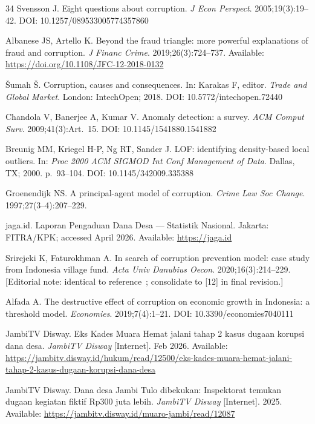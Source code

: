 \documentclass[3p,times,procedia]{elsarticle}
\begin{document}
\begin{thebibliography}{34}
Svensson J. Eight questions about corruption. \textit{J Econ Perspect}. 2005;19(3):19--42. DOI: 10.1257/089533005774357860

Albanese JS, Artello K. Beyond the fraud triangle: more powerful explanations of fraud and corruption. \textit{J Financ Crime}. 2019;26(3):724--737. Available: \url{https://doi.org/10.1108/JFC-12-2018-0132}

\v{S}umah \v{S}. Corruption, causes and consequences. In: Karakas F, editor. \textit{Trade and Global Market}. London: IntechOpen; 2018. DOI: 10.5772/intechopen.72440

Chandola V, Banerjee A, Kumar V. Anomaly detection: a survey. \textit{ACM Comput Surv}. 2009;41(3):Art.~15. DOI: 10.1145/1541880.1541882

Breunig MM, Kriegel H-P, Ng RT, Sander J. LOF: identifying density-based local outliers. In: \textit{Proc 2000 ACM SIGMOD Int Conf Management of Data}. Dallas, TX; 2000. p.\ 93--104. DOI: 10.1145/342009.335388

Groenendijk NS. A principal-agent model of corruption. \textit{Crime Law Soc Change}. 1997;27(3--4):207--229.

jaga.id. Laporan Pengaduan Dana Desa --- Statistik Nasional. Jakarta: FITRA/KPK; accessed April 2026. Available: \url{https://jaga.id}

Srirejeki K, Faturokhman A. In search of corruption prevention model: case study from Indonesia village fund. \textit{Acta Univ Danubius Oecon}. 2020;16(3):214--229. [Editorial note: identical to reference~\cite{ref12}; consolidate to [12] in final revision.]

Alfada A. The destructive effect of corruption on economic growth in Indonesia: a threshold model. \textit{Economies}. 2019;7(4):1--21. DOI: 10.3390/economies7040111

JambiTV Disway. Eks Kades Muara Hemat jalani tahap 2 kasus dugaan korupsi dana desa. \textit{JambiTV Disway} [Internet]. Feb 2026. Available: \url{https://jambitv.disway.id/hukum/read/12500/eks-kades-muara-hemat-jalani-tahap-2-kasus-dugaan-korupsi-dana-desa}

JambiTV Disway. Dana desa Jambi Tulo dibekukan: Inspektorat temukan dugaan kegiatan fiktif Rp300 juta lebih. \textit{JambiTV Disway} [Internet]. 2025. Available: \url{https://jambitv.disway.id/muaro-jambi/read/12087}


\end{thebibliography}
\end{document}

